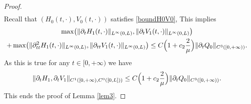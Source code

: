 \begin{proof}
\begin{equation*}
\begin{split}
\end{split}
\end{equation*}
Recall that $(H_{0}(t,\cdot),V_{0}(t,\cdot))$ satisfies \eqref{boundH0V0},
{This implies}
\begin{multline*}
\max\bigl(\|\partial_{t}H_{1}(t,\cdot)\|_{L^{\infty}(0,L)},\|\partial_{t}V_{1}(t,\cdot)\|_{L^{\infty}(0,L)}\bigr)\\
+\max\bigl(\|\partial_{tt}^{2}H_{1}(t,\cdot)\|_{L^{\infty}(0,L)},\|\partial_{tt}V_{1}(t,\cdot)\|_{L^{\infty}(0,L)}\bigr)
\leq C\Bigl(1+c_{2} \frac{2}{\mu}\Bigr) \|\partial_{t}Q_{0}\|_{C^{3}([0,+\infty))}.
\end{multline*}
As this is true for any $t\in [0,+\infty)$ we have
\begin{equation*}
\|\partial_{t}H_{1},\partial_{t}V_{1}\|_{C^{1}([0,+\infty),C^{0}([0,L]))}\leq C\Bigl(1+c_{2} \frac{2}{\mu}\Bigr) \|\partial_{t}Q_{0}\|_{C^{3}([0,+\infty))}.
\end{equation*}
This ends the proof of Lemma \ref{lem3}.
\end{proof}

